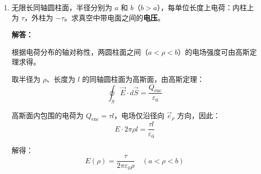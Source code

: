 \begin{enumerate}[label=\arabic*.]
\textbf{解答：}

根据高斯定理，闭合曲面内的总电荷量等于电位移矢量的体积分：
\[
Q = \iiint_V \rho_f \, dV = \iiint_V (\nabla \cdot \vec{D}) \, dV
\]

首先计算体电荷密度 \(\rho_f = \nabla \cdot \vec{D}\)：
\[
\nabla \cdot \vec{D} = \frac{\partial D_x}{\partial x} + \frac{\partial D_y}{\partial y} + \frac{\partial D_z}{\partial z}
\]

其中：
\[
D_x = 2xy, \quad D_y = x^2, \quad D_z = 0
\]

因此：
\[
\frac{\partial D_x}{\partial x} = 2y, \quad \frac{\partial D_y}{\partial y} = 0, \quad \frac{\partial D_z}{\partial z} = 0
\]

所以：
\[
\rho_f = 2y
\]

对 \(\rho_f\) 在平行六面体内积分，求总电荷量：
\[
Q = \int_{x=0}^{1} \int_{y=0}^{2} \int_{z=0}^{3} 2y \, dz \, dy \, dx
\]

分步计算：
\begin{enumerate}
    \item 对 \(z\) 积分：
    \[
    \int_{z=0}^{3} dz = 3
    \]
    \item 对 \(y\) 积分：
    \[
    \int_{y=0}^{2} 2y \cdot 3 \, dy = 3 \int_{0}^{2} 2y \, dy = 3 \left[ y^2 \right]_0^2 = 12
    \]
    \item 对 \(x\) 积分：
    \[
    Q = \int_{x=0}^{1} 12 \, dx = 12
    \]
\end{enumerate}

因此，平行六面体内的总电荷量为 \(Q = 12\ \text{C}\)。

\vspace{1em}

\item 无限长同轴圆柱面，半径分别为 \(a\) 和 \(b\)（\(b > a\)），每单位长度上电荷：内柱上为 \(\tau\)，外柱为 \(-\tau\)。求真空中带电面之间的\textbf{电压}。

\textbf{解答：}

根据电荷分布的轴对称性，两圆柱面之间（\(a < \rho < b\)）的电场强度可由高斯定理求得。

取半径为 \(\rho\)、长度为 \(l\) 的同轴圆柱面为高斯面，由高斯定理：
\[
\oint_S \vec{E} \cdot d\vec{S} = \frac{Q_{\text{enc}}}{\varepsilon_0}
\]

高斯面内包围的电荷为 \(Q_{\text{enc}} = \tau l\)，电场仅沿径向 \(\vec{e}_\rho\) 方向，因此：
\[
E \cdot 2\pi\rho l = \frac{\tau l}{\varepsilon_0}
\]

解得：
\[
E(\rho) = \frac{\tau}{2\pi\varepsilon_0 \rho} \quad (a < \rho < b)
\]


\end{enumerate}
